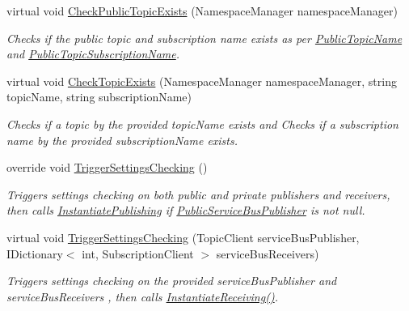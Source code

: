 \begin{DoxyCompactItemize}
virtual void \hyperlink{classCqrs_1_1Azure_1_1ServiceBus_1_1AzureServiceBus_aae464d1d93ae6600ff5ace028160dd3c_aae464d1d93ae6600ff5ace028160dd3c}{Check\+Public\+Topic\+Exists} (Namespace\+Manager namespace\+Manager)
\begin{DoxyCompactList}\small\item\em Checks if the public topic and subscription name exists as per \hyperlink{classCqrs_1_1Azure_1_1ServiceBus_1_1AzureServiceBus_ac6f4fbafebcde04a8493462b688e0abe_ac6f4fbafebcde04a8493462b688e0abe}{Public\+Topic\+Name} and \hyperlink{classCqrs_1_1Azure_1_1ServiceBus_1_1AzureServiceBus_adab1b2f0dc9f199d5f0aa60d57ba71c8_adab1b2f0dc9f199d5f0aa60d57ba71c8}{Public\+Topic\+Subscription\+Name}. \end{DoxyCompactList}\item 
virtual void \hyperlink{classCqrs_1_1Azure_1_1ServiceBus_1_1AzureServiceBus_a167ace15de6e40d5ec0b0c2e0fd95504_a167ace15de6e40d5ec0b0c2e0fd95504}{Check\+Topic\+Exists} (Namespace\+Manager namespace\+Manager, string topic\+Name, string subscription\+Name)
\begin{DoxyCompactList}\small\item\em Checks if a topic by the provided {\itshape topic\+Name}  exists and Checks if a subscription name by the provided {\itshape subscription\+Name}  exists. \end{DoxyCompactList}\item 
override void \hyperlink{classCqrs_1_1Azure_1_1ServiceBus_1_1AzureServiceBus_ae4b736019e332a81eb08d3696f8b6e7e_ae4b736019e332a81eb08d3696f8b6e7e}{Trigger\+Settings\+Checking} ()
\begin{DoxyCompactList}\small\item\em Triggers settings checking on both public and private publishers and receivers, then calls \hyperlink{classCqrs_1_1Azure_1_1ServiceBus_1_1AzureServiceBus_a5c286d29b0bbfe3770f3407efda57036_a5c286d29b0bbfe3770f3407efda57036}{Instantiate\+Publishing} if \hyperlink{classCqrs_1_1Azure_1_1ServiceBus_1_1AzureServiceBus_a17195f3c8e05ec37dfac37a8e9e1b089_a17195f3c8e05ec37dfac37a8e9e1b089}{Public\+Service\+Bus\+Publisher} is not null. \end{DoxyCompactList}\item 
virtual void \hyperlink{classCqrs_1_1Azure_1_1ServiceBus_1_1AzureServiceBus_a31ea4f3f8f5acea0225909611097297e_a31ea4f3f8f5acea0225909611097297e}{Trigger\+Settings\+Checking} (Topic\+Client service\+Bus\+Publisher, I\+Dictionary$<$ int, Subscription\+Client $>$ service\+Bus\+Receivers)
\begin{DoxyCompactList}\small\item\em Triggers settings checking on the provided {\itshape service\+Bus\+Publisher}  and {\itshape service\+Bus\+Receivers} , then calls \hyperlink{classCqrs_1_1Azure_1_1ServiceBus_1_1AzureServiceBus_ad49a2d063279ec98443e7f1d69178cfa_ad49a2d063279ec98443e7f1d69178cfa}{Instantiate\+Receiving()}. \end{DoxyCompactList}\item 

\end{DoxyCompactItemize}
